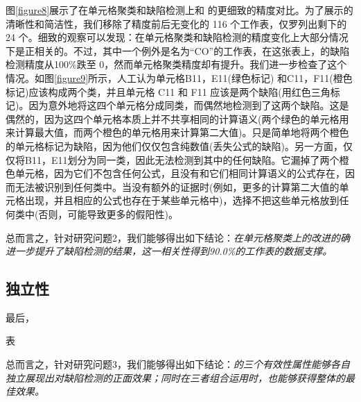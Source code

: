 图\ref{figure8}展示了在单元格聚类和缺陷检测上\wa 和 \cu 的更细致的精度对比。为了展示的清晰性和简洁性，我们移除了精度前后无变化的 116 个工作表，仅罗列出剩下的 24 个。细致的观察可以发现：在单元格聚类和缺陷检测的精度变化上大部分情况下是正相关的。不过，其中一个例外是名为“CO”的工作表，在这张表上，\wa 的缺陷检测精度从100\%跌至 0，然而单元格聚类精度却有提升。我们进一步检查了这个情况。如图\ref{figure9}所示，人工认为单元格{B11，E11}(绿色标记) 和{C11，F11}(橙色标记)应该构成两个类，并且单元格 C11 和 F11 应该是两个缺陷(用红色三角标记)。\cu 因为意外地将这四个单元格分成同类，而偶然地检测到了这两个缺陷。这是偶然的，因为这四个单元格本质上并不共享相同的计算语义(两个绿色的单元格用来计算最大值，而两个橙色的单元格用来计算第二大值)。\cu 只是简单地将两个橙色的单元格标记为缺陷，因为他们仅仅包含纯数值(丢失公式的缺陷)。另一方面，\wa 仅仅将{B11，E11}划分为同一类，因此无法检测到其中的任何缺陷。它漏掉了两个橙色单元格，因为它们不包含任何公式，且没有和它们相同计算语义的公式存在，因而无法被识别到任何类中。当没有额外的证据时(例如，更多的计算第二大值的单元格出现，并且相应的公式也存在于某些单元格中)，\wa 选择不把这些单元格放到任何类中(否则，可能导致更多的假阳性)。

总而言之，针对研究问题2，我们能够得出如下结论：\textit{\wa 在单元格聚类上的改进的确进一步提升了缺陷检测的结果，这一相关性得到90.0\%的工作表的数据支撑。}


\subsection{独立性}

最后，

表

总而言之，针对研究问题3，我们能够得出如下结论：\textit{\wa 的三个有效性属性能够各自独立展现出对缺陷检测的正面效果；同时在三者组合运用时，也能够获得整体的最佳效果。}